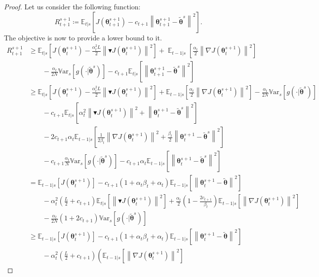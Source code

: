 \documentclass{article}
\theoremstyle{remark}
\theoremstyle{definition}
\DeclareMathOperator*{\EV}{\mathbb{E}}
\newcommand{\EVV}[2][\ppvect \in \ppspace]{\EV_{#1}\left[{#2}\right]}
\newcommand{\norm}[2][\infty]{\left\|#2\right\|_{#1}}
\newcommand{\vtheta}{\boldsymbol{\theta}}
\newcommand{\gradJ}[1]{\nabla J(#1)}
\newcommand{\Ets}[2][t]{\mathbb{E}_{#1\vert s}\left[#2\right]}
\newcommand{\Vars}[1]{{\mathbb{V}\text{ar}}_{s}\left[#1\right]}
\newcommand{\gradBlack}[1]{\blacktriangledown J(#1)}
\begin{document}
\begin{proof}
Let us consider the following function:
\begin{equation}\label{E:lyapunov.function}
	R_{t+1}^{s+1} \coloneqq \Ets{J(\vtheta_{t+1}^{s+1}) - c_{t+1}\norm[]{\vtheta_{t+1}^{s+1}-\tilde{\vtheta}^s}^2}. 
\end{equation}
The objective is now to provide a lower bound to it.
\begingroup
\allowdisplaybreaks
\begin{align}
	R_{t+1}^{s+1} 
	&\geq	\Ets{J(\vtheta_t^{s+1}) - \frac{\alpha_t^2L}{2}\norm[]{\gradBlack{\vtheta_t^{s+1}}}^2}
    + \EVV[t-1|s]{\frac{\alpha_t}{2}\norm[]{\gradJ{\vtheta_t^{s+1}}}^2}
    \nonumber\\
	&\qquad-
	\frac{\alpha_t}{2N}\Vars{g(\cdot\vert\tilde{\vtheta}^s)}
	-c_{t+1}\Ets{\norm[]{\vtheta_{t+1}^{s+1}-\tilde{\vtheta}^s}^2} \label{eq:17}\\
	&\geq \Ets{J(\vtheta_t^{s+1}) - \frac{\alpha_t^2L}{2}\norm[]{\gradBlack{\vtheta_t^{s+1}}}^2} 
	+ \Ets[t-1]{\frac{\alpha_t}{2}\norm[]{\gradJ{\vtheta_t^{s+1}}}^2 }
	-\frac{\alpha_t}{2N}\Vars{g(\cdot\vert\tilde{\vtheta}^s)} \nonumber\\
	&\qquad -c_{t+1}\Ets{\alpha_t^2\norm[]{\gradBlack{\vtheta_t^{s+1}}}^2+\norm[]{\vtheta_t^{s+1}-\tilde{\vtheta}^s}^2}
	\nonumber\\
	&\qquad-2c_{t+1}\alpha_t\Ets[t-1]{\frac{1}{2\beta_t}\norm[]{\gradJ{\vtheta_t^{s+1}}}^2+\frac{\beta_t}{2}\norm[]{\vtheta_t^{s+1}-\tilde{\vtheta}^s}^2} \nonumber\\ 
	&\qquad
	-c_{t+1}\frac{\alpha_t}{N}\Vars{g(\cdot\vert\tilde{\vtheta}^s)} -c_{t+1}\alpha_t\Ets[t-1]{\norm[]{\vtheta_t^{s+1}-\tilde{\vtheta}^s}^2} \label{eq:18}\\
	&= \Ets[t-1]{J(\vtheta_t^{s+1})} - c_{t+1}\left(1+\alpha_t\beta_t+\alpha_t\right)\Ets[t-1]{\norm[]{\vtheta_{t}^{s+1}-\tilde{\vtheta}}^2} \nonumber\\
	&\qquad-\alpha_t^2\left(\frac{L}{2}+c_{t+1}\right)\Ets{\norm[]{\gradBlack{\vtheta_t^{s+1}}}^2}
	+\frac{\alpha_t}{2}\left(1-\frac{2c_{t+1}}{\beta_t}\right)\Ets[t-1]{\norm[]{\gradJ{\vtheta_t^{s+1}}}^2} \nonumber\\
	&\qquad-\frac{\alpha_t}{2N}\left(1+2c_{t+1}\right)\Vars{g(\cdot\vert\tilde{\vtheta}^s)} \nonumber\\
	&\geq  \Ets[t-1]{J(\vtheta_t^{s+1})} - c_{t+1}\left(1+\alpha_t\beta_t+\alpha_t\right)\Ets[t-1]{\norm[]{\vtheta_{t}^{s+1}-\tilde{\vtheta}}^2} \nonumber\\
	&\qquad
	-\alpha_t^2\left(\frac{L}{2}+c_{t+1}\right)\left(\Ets[t-1]{\norm[]{\gradJ{\vtheta_t^{s+1}}}^2} 

\end{align}
\end{proof}
\end{document}
